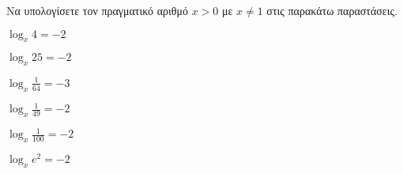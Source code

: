 Να υπολογίσετε τον πραγματικό αριθμό $ x>0$ με $ x\neq 1 $ στις παρακάτω παραστάσεις.
\begin{multicols}{2}
\begin{rlist}
\item $ \log_{x}{4}=-2 $
\item $ \log_{x}{25}=-2 $
\item $ \log_{x}{\frac{1}{64}}=-3 $
\item $ \log_{x}{\frac{1}{49}}=-2 $
\item $ \log_{x}{\frac{1}{100}}=-2 $
\item $ \log_{x}{e^2}=-2 $
\end{rlist}
\end{multicols}
